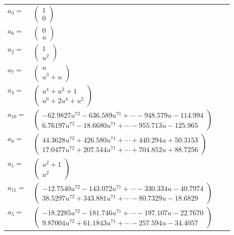 \documentclass[1p]{elsarticle_modified}
\theoremstyle{definition}
\begin{document}
\begin{tabular}{m{7pt} m{180pt} m{7pt} m{180pt} }
\flushright $a_{3}=$&$\begin{pmatrix}1\\0\end{pmatrix}$ \\
\flushright $a_{6}=$&$\begin{pmatrix}0\\u\end{pmatrix}$ \\
\flushright $a_{2}=$&$\begin{pmatrix}1\\u^2\end{pmatrix}$ \\
\flushright $a_{7}=$&$\begin{pmatrix}u\\u^3+u\end{pmatrix}$ \\
\flushright $a_{4}=$&$\begin{pmatrix}u^4+u^2+1\\u^6+2 u^4+u^2\end{pmatrix}$ \\
\flushright $a_{10}=$&$\begin{pmatrix}-62.9827 u^{72}-636.589 u^{71}+\cdots-948.579 u-114.994\\6.76197 u^{72}-18.6680 u^{71}+\cdots-955.713 u-125.965\end{pmatrix}$ \\
\flushright $a_{8}=$&$\begin{pmatrix}44.3628 u^{72}+426.580 u^{71}+\cdots+440.294 u+50.3153\\17.0477 u^{72}+207.544 u^{71}+\cdots+704.852 u+88.7256\end{pmatrix}$ \\
\flushright $a_{1}=$&$\begin{pmatrix}u^2+1\\u^2\end{pmatrix}$ \\
\flushright $a_{11}=$&$\begin{pmatrix}-12.7540 u^{72}-143.072 u^{71}+\cdots-330.334 u-40.7974\\38.5297 u^{72}+343.881 u^{71}+\cdots-80.7329 u-18.6829\end{pmatrix}$ \\
\flushright $a_{5}=$&$\begin{pmatrix}-18.2285 u^{72}-181.746 u^{71}+\cdots-197.107 u-22.7670\\9.87004 u^{72}+61.1843 u^{71}+\cdots-257.594 u-34.4057\end{pmatrix}$ \\

\end{tabular}
\end{document}
